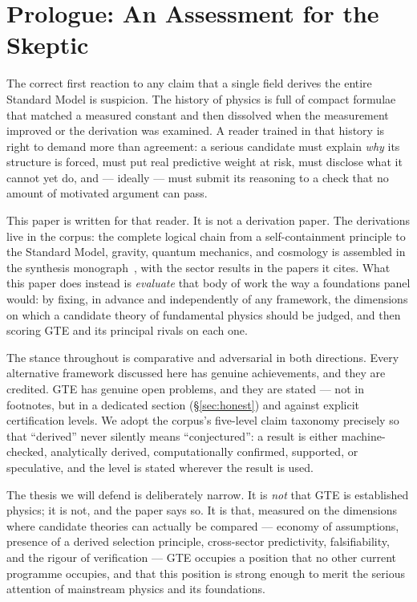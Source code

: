 \documentclass[11pt]{article}
\begin{document}
\tableofcontents
\newpage

\section*{Prologue: An Assessment for the Skeptic}
\label{sec:prologue}

The correct first reaction to any claim that a single field derives the entire
Standard Model is suspicion.  The history of physics is full of compact formulae
that matched a measured constant and then dissolved when the measurement improved
or the derivation was examined.  A reader trained in that history is right to
demand more than agreement: a serious candidate must explain \emph{why} its
structure is forced, must put real predictive weight at risk, must disclose what
it cannot yet do, and --- ideally --- must submit its reasoning to a check that no
amount of motivated argument can pass.

This paper is written for that reader.  It is not a derivation paper.  The
derivations live in the corpus: the complete logical chain from a self-containment
principle to the Standard Model, gravity, quantum mechanics, and cosmology is
assembled in the synthesis monograph~\cite{SpivackGTECompleteFramework}, with the
sector results in the papers it cites.  What this paper does instead is
\emph{evaluate} that body of work the way a foundations panel would: by fixing, in
advance and independently of any framework, the dimensions on which a candidate
theory of fundamental physics should be judged, and then scoring GTE and its
principal rivals on each one.

The stance throughout is comparative and adversarial in both directions.  Every
alternative framework discussed here has genuine achievements, and they are
credited.  GTE has genuine open problems, and they are stated --- not in
footnotes, but in a dedicated section (§\ref{sec:honest}) and against explicit
certification levels.  We adopt the corpus's five-level claim taxonomy precisely
so that ``derived'' never silently means ``conjectured'': a result is either
machine-checked, analytically derived, computationally confirmed, supported, or
speculative, and the level is stated wherever the result is used.

The thesis we will defend is deliberately narrow.  It is \emph{not} that GTE is
established physics; it is not, and the paper says so.  It is that, measured on
the dimensions where candidate theories can actually be compared --- economy of
assumptions, presence of a derived selection principle, cross-sector predictivity,
falsifiability, and the rigour of verification --- GTE occupies a position that no
other current programme occupies, and that this position is strong enough to merit
the serious attention of mainstream physics and its foundations.
\end{document}

